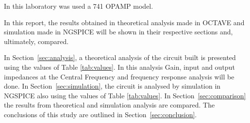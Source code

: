 In this laboratory was used a 741 OPAMP model.

In this report, the results obtained in theoretical analysis made in OCTAVE and simulation made in NGSPICE will be shown in their respective sections and, ultimately, compared.

In Section~\ref{sec:analysis}, a theoretical analysis of the circuit built is presented using the values of Table \ref{tab:values}. In this analysis Gain, input and output impedances at the Central Frequency and frequency response analysis will be done. In Section~\ref{sec:simulation}, the circuit is analysed by simulation in NGSPICE also using the values of Table \ref{tab:values}. In Section~\ref{sec:comparison} the results from theoretical and simulation analysis are compared. The conclusions of this study are outlined in Section~\ref{sec:conclusion}.




